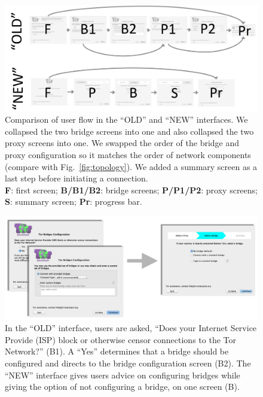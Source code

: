 \documentclass[USenglish,oneside,twocolumn]{article}
\begin{document}
\begin{figure}[t]
\centering
\includegraphics[width=.85\textwidth]{old-and-new-flows.png}
\caption{
Comparison of user flow in the ``OLD'' and ``NEW'' interfaces.
We collapsed the two bridge screens into one 
and also collapsed the two proxy screens into one.
We swapped the order of the bridge and proxy configuration
so it matches the order of network components (compare with Fig.~\ref{fig:topology}).
We added a summary screen as a last step before initiating a connection.\\
\textbf{F}: first screen;
\textbf{B/B1/B2}: bridge screens;
\textbf{P/P1/P2}: proxy screens;
\textbf{S}: summary screen;
\textbf{Pr}: progress bar.
}
\label{fig:flow}
\end{figure} 

\begin{figure}[t]
	\centering
		\includegraphics[width=.8\textwidth]{bridge-screens.pdf} 
		\caption{In the ``OLD'' interface, users are asked, ``Does your Internet Service Provide (ISP) block or 
		otherwise censor connections to the Tor Network?'' (B1). A ``Yes'' determines that a bridge should 
		be configured and directs to the bridge configuration screen (B2). 
		The ``NEW'' interface gives users advice on configuring bridges
		while giving the option of not configuring a bridge, on one screen (B).} 
\end{figure} 
\end{document}
